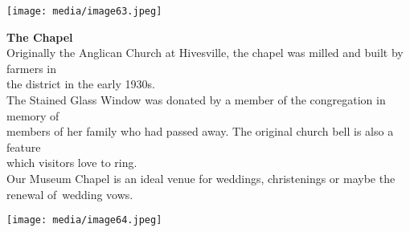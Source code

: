\texttt{[image: media/image63.jpeg]}

\textbf{The Chapel}\\
Originally the Anglican Church at Hivesville, the chapel was milled and built by farmers in\\
the district in the early 1930s.\\
The Stained Glass Window was donated by a member of the congregation in memory of\\
members of her family who had passed away. The original church bell is also a feature\\
which visitors love to ring.\\
Our Museum Chapel is an ideal venue for weddings, christenings or maybe the renewal of~wedding vows.

\texttt{[image: media/image64.jpeg]}
